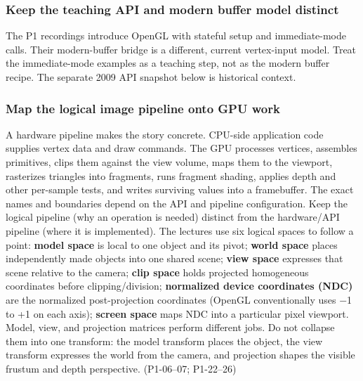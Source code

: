 \subsubsection{Keep the teaching API and modern buffer model distinct}\label{03-visual-computing-i-ch018-keep-the-teaching-api-and-modern-buffer-model-distinct}

\hypertarget{03-visual-computing-i-ch018-keep-the-teaching-api-and-modern-buffer-model-distinct}{}

The P1 recordings introduce OpenGL with stateful setup and immediate-mode calls. Their modern-buffer bridge is a different, current vertex-input model. Treat the immediate-mode examples as a teaching step, not as the modern buffer recipe. The separate 2009 API snapshot below is historical context.

\subsubsection{Map the logical image pipeline onto GPU work}\label{03-visual-computing-i-ch018-map-the-logical-image-pipeline-onto-gpu-work}

\hypertarget{03-visual-computing-i-ch018-map-the-logical-image-pipeline-onto-gpu-work}{}

A hardware pipeline makes the story concrete. CPU-side application code supplies vertex data and draw commands. The GPU processes vertices, assembles primitives, clips them against the view volume, maps them to the viewport, rasterizes triangles into fragments, runs fragment shading, applies depth and other per-sample tests, and writes surviving values into a framebuffer. The exact names and boundaries depend on the API and pipeline configuration. Keep the logical pipeline (why an operation is needed) distinct from the hardware/API pipeline (where it is implemented). The lectures use six logical spaces to follow a point: \textbf{model space} is local to one object and its pivot; \textbf{world space} places independently made objects into one shared scene; \textbf{view space} expresses that scene relative to the camera; \textbf{clip space} holds projected homogeneous coordinates before clipping/division; \textbf{normalized device coordinates (NDC)} are the normalized post-projection coordinates (OpenGL conventionally uses −1 to +1 on each axis); \textbf{screen space} maps NDC into a particular pixel viewport. Model, view, and projection matrices perform different jobs. Do not collapse them into one transform: the model transform places the object, the view transform expresses the world from the camera, and projection shapes the visible frustum and depth perspective. (P1-06--07; P1-22--26)

